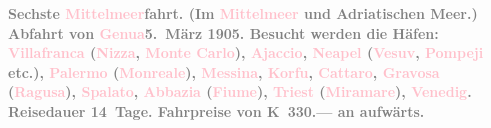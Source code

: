 \documentclass[twoside=false,titlepage=false,open=any, parskip=never, fontsize=12pt, headings=small, chapterprefix=false, appendixprefix=false]{scrbook}
\begin{document}
           \textcolor{gray}{\textbf{\textbf{Sechste \textcolor{pink}{Mittelmeer}{}\ledrightnote{\textcolor{pink}{Mittelmeer}}fahrt.}
                  (Im \textcolor{pink}{Mittelmeer}{}\ledrightnote{\textcolor{pink}{Mittelmeer}} und Adriatischen Meer.) Abfahrt
                  von \textcolor{pink}{Genua}{}\ledrightnote{\textcolor{pink}{Genua}}{ }\textbf{5. März 1905}. Besucht werden die Häfen: \textcolor{pink}{Villafranca}{}\ledrightnote{\textcolor{pink}{Villefranche-sur-Mer}}
                     (\textcolor{pink}{Nizza}{}\ledrightnote{\textcolor{pink}{Nizza}}, \textcolor{pink}{Monte
                     Carlo}{}\ledrightnote{\textcolor{pink}{Monte Carlo}}), \textcolor{pink}{Ajaccio}{}\ledrightnote{\textcolor{pink}{Ajaccio}}, \textcolor{pink}{Neapel}{}\ledrightnote{\textcolor{pink}{Neapel}} (\textcolor{pink}{Vesuv}{}\ledrightnote{\textcolor{pink}{Vesuv}}, \textcolor{pink}{Pompeji}{}\ledrightnote{\textcolor{pink}{Pompei}} etc.), \textcolor{pink}{Palermo}{}\ledrightnote{\textcolor{pink}{Palermo}} (\textcolor{pink}{Monreale}{}\ledrightnote{\textcolor{pink}{Monreale}}), \textcolor{pink}{Messina}{}\ledrightnote{\textcolor{pink}{Messina}}, \textcolor{pink}{Korfu}{}\ledrightnote{\textcolor{pink}{Korfu}}, \textcolor{pink}{Cattaro}{}\ledrightnote{\textcolor{pink}{Kotor}}, \textcolor{pink}{Gravosa}{}\ledrightnote{\textcolor{pink}{Dubrovnik}} (\textcolor{pink}{Ragusa}{}\ledrightnote{\textcolor{pink}{Dubrovnik}}), \textcolor{pink}{Spalato}{}\ledrightnote{\textcolor{pink}{Split}}, \textcolor{pink}{Abbazia}{}\ledrightnote{\textcolor{pink}{Opatija}} (\textcolor{pink}{Fiume}{}\ledrightnote{\textcolor{pink}{Rijeka}}), \textcolor{pink}{Triest}{}\ledrightnote{\textcolor{pink}{Triest}}
                     (\textcolor{pink}{Miramare}{}\ledrightnote{\textcolor{pink}{Schloss Miramare}}), \textcolor{pink}{Venedig}{}\ledrightnote{\textcolor{pink}{Venedig}}. Reisedauer 14 Tage. Fahrpreise von \textbf{K 330.—}
                  an aufwärts.}}\pend
           \pstart
\end{document}
